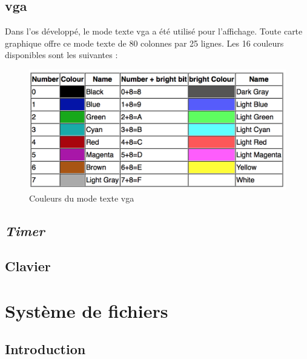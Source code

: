 \documentclass[a4paper]{article}
\begin{document}

\subsection{\acrshort{vga}}
Dans l'\acrshort{os} développé, le mode texte \acrshort{vga} a été utilisé pour
l'affichage. Toute carte graphique offre ce mode texte de 80 colonnes par 25 lignes.
Les 16 couleurs disponibles sont les suivantes :
\begin{figure}[!h]
  \centering
  \includegraphics[scale=0.7]{images/colors.png}
  \caption{Couleurs du mode texte \acrshort{vga}}
\end{figure}


\subsection{\textit{Timer}}


\subsection{Clavier}

\newpage

\section{Système de fichiers}
\subsection{Introduction}
\end{document}
